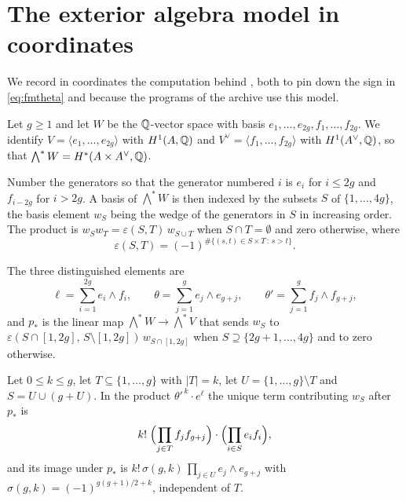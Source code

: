 \section{The exterior algebra model in coordinates}\label{app:exterior}

We record in coordinates the computation behind , both to
pin down the sign in \eqref{eq:fmtheta} and because the programs of the
archive \cite{BMB26} use this model.

Let $g\ge1$ and let $W$ be the $\mathbb{Q}$-vector space with basis
$e_{1},\dots,e_{2g},f_{1},\dots,f_{2g}$. We identify
$V=\langle e_{1},\dots,e_{2g}\rangle$ with $H^{1}(A,\mathbb{Q})$ and
$V^{\vee}=\langle f_{1},\dots,f_{2g}\rangle$ with $H^{1}(A^{\vee},\mathbb{Q})$, so that
$\bigwedge^{*}W=H^{*}(A\times A^{\vee},\mathbb{Q})$.

Number the generators so that the generator numbered $i$ is $e_{i}$ for
$i\le2g$ and $f_{i-2g}$ for $i>2g$. A basis of $\bigwedge^{*}W$ is then
indexed by the subsets $S$ of $\{1,\dots,4g\}$, the basis element $w_{S}$
being the wedge of the generators in $S$ in increasing order. The product
is $w_{S}w_{T}=\varepsilon(S,T)\,w_{S\cup T}$ when $S\cap T=\emptyset$ and zero
otherwise, where
\begin{equation}\label{eq:shufflesign}
  \varepsilon(S,T)=(-1)^{\#\{(s,t)\in S\times T\,:\,s>t\}} .
\end{equation}

The three distinguished elements are
\[
  \ell=\sum_{i=1}^{2g}e_{i}\wedge f_{i},
  \qquad
  \theta=\sum_{j=1}^{g}e_{j}\wedge e_{g+j},
  \qquad
  \theta'=\sum_{j=1}^{g}f_{j}\wedge f_{g+j},
\]
and $p_{*}$ is the linear map $\bigwedge^{*}W\to\bigwedge^{*}V$ that sends
$w_{S}$ to $\varepsilon(S\cap[1,2g],\,S\setminus[1,2g])\,w_{S\cap[1,2g]}$ when
$S\supseteq\{2g+1,\dots,4g\}$ and to zero otherwise.

\begin{lemma}\label{lem:appsign}
Let $0\le k\le g$, let $T\subseteq\{1,\dots,g\}$ with $|T|=k$, let
$U=\{1,\dots,g\}\setminus T$ and $S=U\cup(g+U)$. In the product
$\theta'^{\,k}\cdot e^{\ell}$ the unique term contributing $w_{S}$ after
$p_{*}$ is
\[
  k!\;\Bigl(\prod_{j\in T}f_{j}f_{g+j}\Bigr)\cdot\Bigl(\prod_{i\in S}e_{i}f_{i}\Bigr),
\]
and its image under $p_{*}$ is
$k!\,\sigma(g,k)\,\prod_{j\in U}e_{j}\wedge e_{g+j}$ with
$\sigma(g,k)=(-1)^{g(g+1)/2+k}$, independent of $T$.
\end{lemma}

